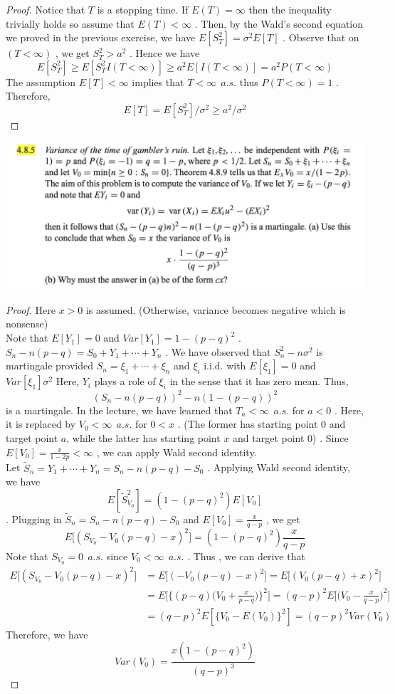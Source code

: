 \documentclass[12pt, A4]{article}
\begin{document}
\begin{proof}
    Notice that $T$ is a stopping time. If $E(T)=\infty$ then the inequality trivially holds so assume that $E(T)<\infty$ . Then, by the Wald's second equation we proved in the previous exercise, we have $E[S_T^2] = \sigma^2 E[T]$ . Observe that on $(T<\infty)$ , we get $S_T^2>a^2$ . Hence we have $$E[S_T^2] \geq E[S_T^2 I(T<\infty)]\geq a^2E[I(T<\infty)] = a^2 P(T<\infty)$$ The assumption $E[T]<\infty$ implies that $T<\infty \;\,a.s.$ thus $P(T<\infty)=1$ . Therefore, $$E[T]= E[S_T^2]/ \sigma^2\geq a^2/\sigma^2 $$
\end{proof}

\vspace{1cm}

\includegraphics[width=17cm]{Exer4.8.5.png}

\begin{proof}
    Here $x>0$ is assumed. (Otherwise, variance becomes negative which is nonsense)\\
    Note that $E[Y_1] = 0$ and $Var[Y_1] = 1 - (p-q)^2$ . $S_n - n(p-q) = S_0 + Y_1+\cdots + Y_n$ . We have observed that $S_n^2 -n\sigma^2$ is martingale provided $S_n = \xi_1+\cdots+\xi_n$ and $\xi_i$ i.i.d. with $E[\xi_1]=0$ and $Var[\xi_1]\sigma^2$ Here, $Y_i$ plays a role of $\xi_i$ in the sense that it has zero mean. Thus, $$(S_n - n(p-q))^2 -n(1-(p-q))^2 $$ is a martingale. In the lecture, we have learned that $T_a<\infty \;\,a.s.$ for $a<0$ . Here, it is replaced by $V_0<\infty \;\,a.s.$ for $0<x$ . (The former has starting point $0$ and target point $a$, while the latter has starting point $x$ and target point $0$) . Since $E[V_0] = \frac{x}{1-2p}<\infty$ , we can apply Wald second identity. \\ Let $\tilde S_n = Y_1+\cdots+Y_n = S_n - n(p-q)-S_0$ . Applying Wald second identity, we have $$E[\tilde{S}_{V_0}^2] = (1-(p-q)^2)E[V_0] $$. Plugging in $\tilde S_n =S_n - n(p-q)-S_0$ and $E[V_0]=\frac{x}{q-p}$ , we get
    $$E\big[(S_{V_0} - V_0(p-q)-x)^2 \big]= (1-(p-q)^2)\frac{x}{q-p} $$ Note that $S_{V_0}=0\;\,a.s.$ since $V_0<\infty \;\,a.s.$ . Thus , we can derive that 
    \begin{align*}
        E\big[(S_{V_0} - V_0(p-q)-x)^2 \big]&= E\big[(-V_0(p-q)-x)^2\big] = E\big[(V_0(p-q)+x)^2\big]\\ 
        &= E\big[\big\{(p-q)\big(V_0+\frac{x}{p-q} \big)\big\}^2\big] = (q-p)^2 E\big[\big(V_0 -\frac{x}{q-p}\big)^2\big] \\ &= (q-p)^2 E[\{V_0 -E(V_0)\}^2] = (q-p)^2 Var(V_0)
    \end{align*}
    Therefore, we have
    $$Var(V_0)= \frac{x(1-(p-q)^2)}{(q-p)^3} $$
\end{proof}
\end{document}
